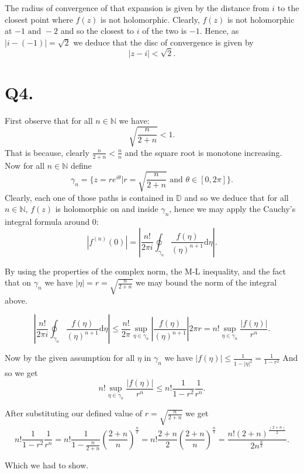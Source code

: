 \documentclass[12pt]{article}
\newcommand\N{\mathbb{N}}
\begin{document}
The radius of convergence of that expansion is given by the distance from $i$ to the closest point where  $f(z)$ is 
not holomorphic. Clearly,  $f(z)$ is not holomorphic at  $-1 \text{ and } -2$ and so the closest to $i$ of the two is
$-1$. Hence, as  $|i - (-1)| = \sqrt{2}$  we deduce that the disc of convergence is given by 
\[
	|z - i| < \sqrt{2}
.\]

\section*{Q4.}
First observe that for all $n \in \N$ we have:
\[
	\sqrt{\frac{n}{2 + n}} < 1
.\]
That is because, clearly $	\frac{n}{2 + n} < \frac{n}{n} $ and the square root is monotone increasing.
Now for all $n \in \N$ define
\[
	\gamma_n = \{z = re^{i\theta} | r = \sqrt{\frac{n}{2 + n}} \text{ and } \theta \in [0, 2\pi]\}
.\]
Clearly, each one of those paths is contained in $\mathbb{D}$ and so we deduce that for all $n \in \N$, $f(z)$ is 
holomorphic on and inside $\gamma_n$, hence we may apply the Cauchy's integral formula around 0:
\[
	|f^{(n)}(0)| = \left|\frac{n !}{2\pi i}\oint_{\gamma_n} \frac{f(\eta)}{(\eta)^{n+1}}\text{d}\eta\right|
.\]

By using the properties of the complex norm, the M-L inequality, and the fact that on 
$\gamma_n$ we have  $|\eta| = r = \sqrt{\frac{n}{2 + n}}$ we may bound the norm of the integral above.

\[
	\left|\frac{n !}{2\pi i}\oint_{\gamma_n} \frac{f(\eta)}{(\eta)^{n+1}}\text{d}\eta\right| \leq
	\frac{n !}{2\pi} \sup_{\eta \in \gamma_n} \left|\frac{f(\eta)}{(\eta)^{n+1}}\right|2\pi r = 
	n! \sup_{\eta \in \gamma_n} \frac{|f(\eta)|}{r^{n}} 
.\]

Now by the given assumption for all $\eta$ in $\gamma_n$ we have 
$|f(\eta)| \leq \frac{1}{1 - |\eta|^2} = \frac{1}{1 - r^2}$
And so we get
\[
	n! \sup_{\eta \in \gamma_n} \frac{|f(\eta)|}{r^{n}} \leq n!\frac{1}{1 - r^2}\frac{1}{r^n}
.\]

After substituting our defined value of $r = \sqrt{\frac{n}{2 + n}}$ we get 
\[
	n!\frac{1}{1 - r^2}\frac{1}{r^n} = n!\frac{1}{1 - \frac{n}{2+n}}\left(\frac{2+n}{n}\right)^{\frac{n}{2}} = 
	n!\frac{2 + n}{2}\left(\frac{2+n}{n}\right)^{\frac{n}{2}} =
	\frac{n!(2+n)^{\frac{(2+n)}{2}}}{2n^{\frac{n}{2}}}
.\]

Which we had to show.
\end{document}
